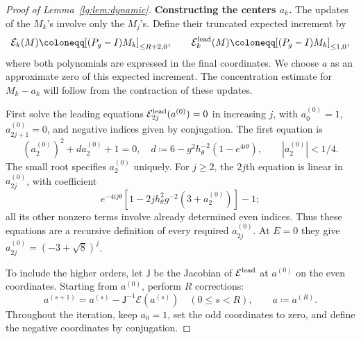\documentclass[11pt]{article}
\numberwithin{equation}{section}
\theoremstyle{remark}
\begin{document}
\begin{proof}[Proof of Lemma~\ref{lg:lem:dynamic}]
\noindent\textbf{Constructing the centers $a_k$.}
The updates of the $M_k$'s involve only the $M_j$'s. Define their
truncated expected increment by
\[
 \mathcal E_k(M)\coloneqq[(P_g-I)M_k]_{\le R+2,0},
 \qquad
 \mathcal E_k^{\rm lead}(M)\coloneqq[(P_g-I)M_k]_{\le1,0},
\]
where both polynomials are expressed in the final coordinates.
We choose $a$ as an approximate zero of this expected increment.
The concentration estimate for $M_k-a_k$ will follow from the
contraction of these updates.

First solve the leading equations
$\mathcal E_{2j}^{\rm lead}(a^{(0)})=0$ in increasing $j$,
with $a_0^{(0)}=1$, $a_{2j+1}^{(0)}=0$, and negative indices given
by conjugation. The first equation is
\begin{equation}\label{lg:eq:a2}
 (a_2^{(0)})^2+d a_2^{(0)}+1=0,\quad
 d\coloneqq6-g^2h_\theta^{-2}(1-e^{4i\theta}),\qquad
 |a_2^{(0)}|<1/4.
\end{equation}
The small root specifies $a_2^{(0)}$ uniquely. For $j\ge2$, the
$2j$th equation is linear in $a_{2j}^{(0)}$, with coefficient
\[
 e^{-4ij\theta}[1-2j h_\theta^2g^{-2}(3+a_2^{(0)})]-1;
\]
all its other nonzero terms involve already determined even indices.
Thus these equations are a recursive definition of every required
$a_{2j}^{(0)}$. At $E=0$ they give
$a_{2j}^{(0)}=(-3+\sqrt8)^j$.

To include the higher orders, let $\mathsf J$ be the Jacobian of
$\mathcal E^{\rm lead}$ at $a^{(0)}$ on the even coordinates.
Starting from $a^{(0)}$, perform $R$ corrections:
\begin{equation}\label{lg:eq:center-recursion}
 a^{(s+1)}=a^{(s)}-\mathsf J^{-1}\mathcal E(a^{(s)})
 \quad(0\le s<R),\qquad a\coloneqq a^{(R)}.
\end{equation}
Throughout the iteration, keep $a_0=1$, set the odd coordinates
to zero, and define the negative coordinates by conjugation. 


\end{proof}
\end{document}
